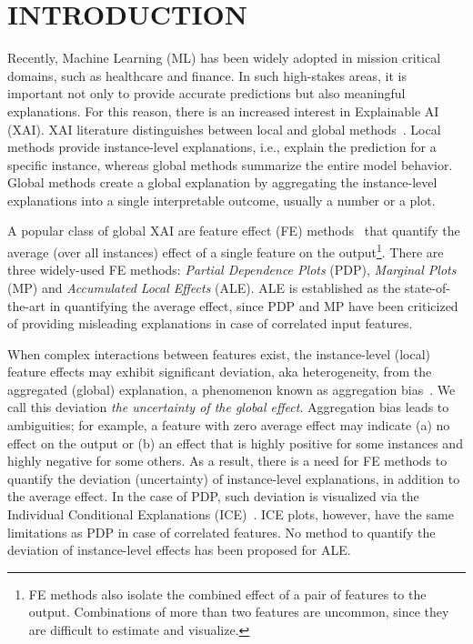 \documentclass[twoside]{article}
\begin{document}
\section{INTRODUCTION}

Recently, Machine Learning (ML) has been widely adopted in mission critical domains,
such as healthcare and finance. In such high-stakes areas,  it is important not only to provide accurate predictions but also meaningful explanations. For this reason, there is an increased interest in Explainable
AI (XAI). XAI literature distinguishes between local and global
methods~\citep{Molnar2020interpretable}. Local methods provide
instance-level explanations, i.e., explain the prediction for a
specific instance, whereas global methods summarize the entire model
behavior. Global methods create a global explanation by aggregating the
instance-level explanations into a single interpretable outcome,
usually a number or a plot.  

A popular class of global XAI are feature effect (FE)
methods~\citep{Gromping2020MAEP} that quantify the average (over all
instances) effect of a single feature on the output\footnote{FE
  methods also isolate the combined effect of a pair of features to
  the output. Combinations of more than two features are uncommon,
  since they are difficult to estimate and visualize.}. There are
three widely-used FE methods: \emph{Partial Dependence Plots}
(PDP)\citep{friedman2001greedy}, \emph{Marginal Plots}
(MP)\citep{apley2020visualizing} and \emph{Accumulated Local Effects}
(ALE)\citep{apley2020visualizing}. ALE is established as the
state-of-the-art in quantifying the average effect, since PDP and MP
have been criticized~\citep{Gromping2020MAEP} of providing misleading explanations in case of  correlated input features.

When complex interactions between features exist, the instance-level
(local) feature effects may exhibit significant deviation, aka heterogeneity, from the aggregated (global)
explanation, a phenomenon known as aggregation
  bias~\citep{mehrabi2021survey}. We call this deviation \emph{the uncertainty of the global effect}. Aggregation bias leads to
ambiguities; for example, a feature with zero average effect may
indicate (a) no effect on the output or (b) an effect that is highly
positive for some instances and highly negative for some others. As a
result, there is a need for FE methods to quantify the deviation (uncertainty) of
instance-level explanations, in addition to the average effect. In the
case of PDP, such deviation is visualized via the Individual
Conditional Explanations (ICE)~\citep{goldstein2015peeking}. ICE
plots, however, have the same limitations as PDP in case of correlated
features. No method to quantify the deviation of instance-level effects has been proposed for ALE.
\end{document}
